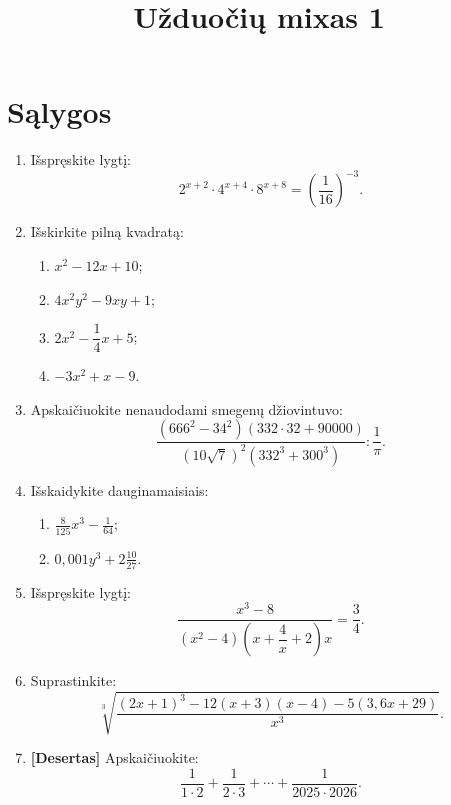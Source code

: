 \documentclass[12pt, a4paper]{article}
\title{\textbf{Užduočių mixas 1}}
\date{}
\begin{document}
\maketitle

\section{Sąlygos}

\begin{enumerate}[label=\textbf{\arabic* užduotis.}, leftmargin=*]

    \item Išspręskite lygtį:
    \[
    2^{x+2}\cdot 4^{x+4}\cdot 8^{x+8}
    =\left(\frac{1}{16}\right)^{-3}.
    \]

    \item Išskirkite pilną kvadratą:
    \begin{enumerate}[label=\alph*)]
        \item $x^2-12x+10$;
        \item $4x^2y^2-9xy+1$;
        \item $2x^2-\dfrac14 x+5$;
        \item $-3x^2+x-9$.
    \end{enumerate}

    \item Apskaičiuokite nenaudodami smegenų džiovintuvo:
    \[
    \frac{(666^2-34^2)(332\cdot 32+90000)}
    {(10\sqrt7)^2(332^3+300^3)}
    :\frac{1}{\pi}.
    \]
    
    \item Išskaidykite dauginamaisiais:
\begin{enumerate}[label=\alph*)]
    \item $\displaystyle \frac{8}{125}x ^{3} - \frac{1}{64}  $;
    \item $\displaystyle 0,001y ^{3} + 2 \frac{10}{27}   $.

\end{enumerate}

    \item Išspręskite lygtį:
    \[
    \frac{x^3-8}
    {(x^2-4)\left(x+\dfrac4x+2\right)x}
    =\frac34.
    \]

    \item Suprastinkite:
    \[
    \sqrt[3]{\frac{(2x+1)^3-12(x+3)(x-4)-5(3{,}6x+29)}{x^3}}.
    \]

    \item \textbf{[Desertas]} Apskaičiuokite:
    \[
    \frac{1}{1\cdot2}+\frac{1}{2\cdot3}+\cdots+\frac{1}{2025\cdot2026}.
    \]

\end{enumerate}
\end{document}
